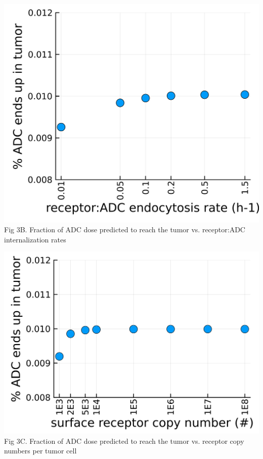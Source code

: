 \documentclass[portrait,fontscale=0.3,paperwidth=36in,paperheight=48in]{baposter}
\begin{document}
\begin{poster}
{\begin{minipage}[ht]{0.23\linewidth}
\centering
\includegraphics[width=\textwidth]{../img/param-scan/endocytosis-tumor-ADC-percentage.png}
\tiny{Fig 3B. Fraction of ADC dose predicted to reach the tumor vs. receptor:ADC internalization rates}
\end{minipage}
\hspace{0.2cm}
\begin{minipage}[ht]{0.23\linewidth}
\centering
\includegraphics[width=\textwidth]{../img/param-scan/HER2-tumor-ADC-percentage.png}
\tiny{Fig 3C. Fraction of ADC dose predicted to reach the tumor  vs. receptor copy numbers per tumor cell}

\end{minipage}}
\end{poster}
\end{document}
